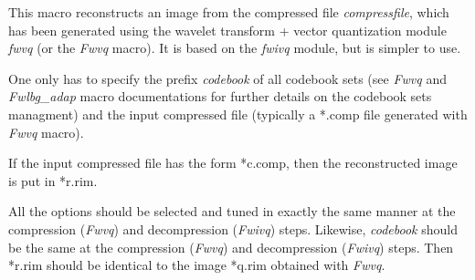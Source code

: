 This macro reconstructs an image from the compressed file {\em compressfile}, 
which has been generated using the wavelet transform + vector quantization 
module {\em fwvq} (or the {\em Fwvq} macro). It is based on the {\em fwivq} 
module, but is simpler to use. 

One only has to specify the prefix {\em codebook} of all codebook sets 
(see {\em Fwvq} and {\em Fwlbg\_adap} macro documentations for further 
details on the codebook sets managment) and the input compressed file 
(typically a *.comp file generated with {\em Fwvq} macro). 

If the input compressed file has the form *c.comp, then the reconstructed 
image is put in *r.rim. 


All the options should be selected and tuned in exactly the same 
manner at the compression ({\em Fwvq}) and decompression ({\em Fwivq}) steps. 
Likewise, {\em codebook} should be the same 
at the compression ({\em Fwvq}) and decompression ({\em Fwivq}) steps. 
Then *r.rim should be identical to the image *q.rim obtained with {\em Fwvq}. 
